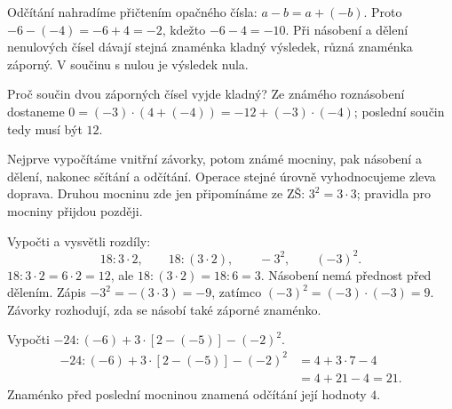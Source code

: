 \documentclass[11pt,a4paper]{article}
\begin{document}
Odčítání nahradíme přičtením opačného čísla: $a-b=a+(-b)$.
Proto $-6-(-4)=-6+4=-2$, kdežto $-6-4=-10$.
Při násobení a dělení nenulových čísel dávají stejná znaménka kladný
výsledek, různá znaménka záporný. V součinu s nulou je výsledek nula.

Proč součin dvou záporných čísel vyjde kladný? Ze známého roznásobení
dostaneme $0=(-3)\cdot(4+(-4))=-12+(-3)\cdot(-4)$;
poslední součin tedy musí být $12$.


Nejprve vypočítáme vnitřní závorky, potom známé mocniny,
pak násobení a dělení, nakonec sčítání a odčítání.
Operace stejné úrovně vyhodnocujeme zleva doprava.
Druhou mocninu zde jen připomínáme ze ZŠ: $3^2=3\cdot3$;
pravidla pro mocniny přijdou později.

\begin{prikladReseniBox}[title={Příklad 4},breakable=false]
Vypočti a vysvětli rozdíly:
\[
18:3\cdot2,\qquad 18:(3\cdot2),\qquad -3^2,\qquad (-3)^2.
\]
\tcblower
$18:3\cdot2=6\cdot2=12$, ale $18:(3\cdot2)=18:6=3$.
Násobení nemá přednost před dělením.
Zápis $-3^2=-(3\cdot3)=-9$, zatímco $(-3)^2=(-3)\cdot(-3)=9$.
Závorky rozhodují, zda se násobí také záporné znaménko.
\end{prikladReseniBox}

\begin{prikladReseniBox}[title={Příklad 5},breakable=false]
Vypočti $-24:(-6)+3\cdot[2-(-5)]-(-2)^2$.
\tcblower
\begin{align*}
-24:(-6)+3\cdot[2-(-5)]-(-2)^2
 &=4+3\cdot7-4\\
 &=4+21-4=21.
\end{align*}
Znaménko před poslední mocninou znamená odčítání její hodnoty $4$.
\end{prikladReseniBox}
\end{document}
